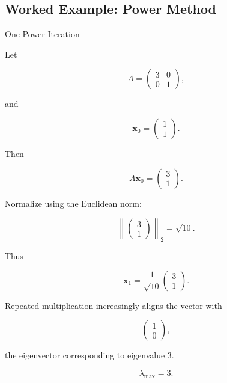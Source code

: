 \subsection{Worked Example: Power Method}
\label{subsec:worked-power-method}

\begin{workedexamplebox}{One Power Iteration}

Let

\[
A
=
\begin{pmatrix}
3&0\\
0&1
\end{pmatrix},
\]

and

\[
\mathbf{x}_0
=
\begin{pmatrix}
1\\
1
\end{pmatrix}.
\]

Then

\[
A\mathbf{x}_0
=
\begin{pmatrix}
3\\
1
\end{pmatrix}.
\]

Normalize using the Euclidean norm:

\[
\left\|
\begin{pmatrix}
3\\
1
\end{pmatrix}
\right\|_2
=
\sqrt{10}.
\]

Thus

\[
\mathbf{x}_1
=
\frac1{\sqrt{10}}
\begin{pmatrix}
3\\
1
\end{pmatrix}.
\]

Repeated multiplication increasingly aligns the vector with

\[
\begin{pmatrix}
1\\
0
\end{pmatrix},
\]

the eigenvector corresponding to eigenvalue \(3\).

\begin{answerbox}
\[
\boxed{
\lambda_{\max}=3.
}
\]
\end{answerbox}

\end{workedexamplebox}

